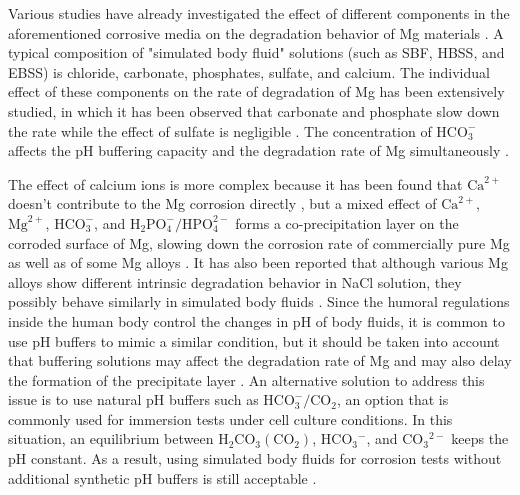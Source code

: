 Various studies have already investigated the effect of different components in the aforementioned corrosive media on the degradation behavior of Mg materials \cite{Mei2019,Zeng2014,Johnston2017, Lamaka2018,Mei2019a}. A typical composition of "simulated body fluid" solutions (such as {SBF}, {HBSS}, and {EBSS}) is chloride, carbonate, phosphates, sulfate, and calcium. The individual effect of these components on the rate of degradation of Mg has been extensively studied, in which it has been observed that carbonate and phosphate slow down the rate while the effect of sulfate is negligible \cite{Johnston2017,Mei2019a}. The concentration of $\mathrm{HCO}_{3}^{-}$ affects the pH buffering capacity and the degradation rate of Mg simultaneously \cite{Xin2011}.

The effect of calcium ions is more complex because it has been found that $\mathrm{Ca}^{2+}$ doesn't contribute to the Mg corrosion directly \cite{Willumeit-Roemer2019}, but a mixed effect of $\mathrm{Ca}^{2+}$, $\mathrm{Mg}^{2+}$, $\mathrm{HCO}_{3}^{-}$, and $\mathrm{H}_{2} \mathrm{PO}_{4}^{-} / \mathrm{HPO}_{4}^{2-}$ forms a co-precipitation layer on the corroded surface of Mg, slowing down the corrosion rate of commercially pure Mg as well as of some Mg alloys \cite{Mei2019,Lamaka2018}. It has also been reported that although various Mg alloys show different intrinsic degradation behavior in NaCl solution, they possibly behave similarly in simulated body fluids \cite{Agha2016,Mei2019a}. Since the humoral regulations inside the human body control the changes in pH of body fluids, it is common to use pH buffers to mimic a similar condition, but it should be taken into account that buffering solutions may affect the degradation rate of Mg \cite{Cui2017,Kannan2017} and may also delay the formation of the precipitate layer \cite{Lamaka2018}. An alternative solution to address this issue is to use natural pH buffers such as $\mathrm{HCO}_{3}^{-}/\mathrm{CO}_{2}$, an option that is commonly used for immersion tests under cell culture conditions. In this situation, an equilibrium between $\mathrm{H}_{2} \mathrm{CO}_{3}\left(\mathrm{CO}_{2}\right)$, $\mathrm{HCO}_{3}{ }^{-}$, and $\mathrm{CO}_{3}{ }^{2-}$ keeps the pH constant. As a result, using simulated body fluids for corrosion tests without additional synthetic pH buffers is still acceptable \cite{Lamaka2018,Mei2019a}.

